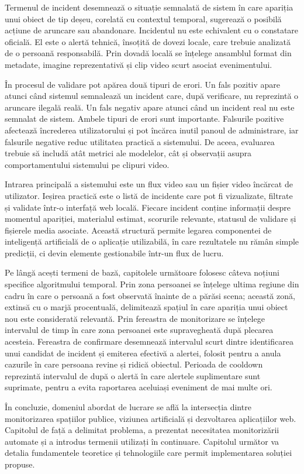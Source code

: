 Termenul de incident desemnează o situație semnalată de sistem în care apariția unui obiect de tip deșeu, corelată cu contextul temporal, sugerează o posibilă acțiune de aruncare sau abandonare. Incidentul nu este echivalent cu o constatare oficială. El este o alertă tehnică, însoțită de dovezi locale, care trebuie analizată de o persoană responsabilă. Prin dovadă locală se înțelege ansamblul format din metadate, imagine reprezentativă și clip video scurt asociat evenimentului.

În procesul de validare pot apărea două tipuri de erori. Un fals pozitiv apare atunci când sistemul semnalează un incident care, după verificare, nu reprezintă o aruncare ilegală reală. Un fals negativ apare atunci când un incident real nu este semnalat de sistem. Ambele tipuri de erori sunt importante. Falsurile pozitive afectează încrederea utilizatorului și pot încărca inutil panoul de administrare, iar falsurile negative reduc utilitatea practică a sistemului. De aceea, evaluarea trebuie să includă atât metrici ale modelelor, cât și observații asupra comportamentului sistemului pe clipuri video.

Intrarea principală a sistemului este un flux video sau un fișier video încărcat de utilizator. Ieșirea practică este o listă de incidente care pot fi vizualizate, filtrate și validate într-o interfață web locală. Fiecare incident conține informații despre momentul apariției, materialul estimat, scorurile relevante, statusul de validare și fișierele media asociate. Această structură permite legarea componentei de inteligență artificială de o aplicație utilizabilă, în care rezultatele nu rămân simple predicții, ci devin elemente gestionabile într-un flux de lucru.

Pe lângă acești termeni de bază, capitolele următoare folosesc câteva noțiuni specifice algoritmului temporal. Prin zona persoanei se înțelege ultima regiune din cadru în care o persoană a fost observată înainte de a părăsi scena; această zonă, extinsă cu o marjă procentuală, delimitează spațiul în care apariția unui obiect nou este considerată relevantă. Prin fereastra de monitorizare se înțelege intervalul de timp în care zona persoanei este supravegheată după plecarea acesteia. Fereastra de confirmare desemnează intervalul scurt dintre identificarea unui candidat de incident și emiterea efectivă a alertei, folosit pentru a anula cazurile în care persoana revine și ridică obiectul. Perioada de cooldown reprezintă intervalul de după o alertă în care alertele suplimentare sunt suprimate, pentru a evita raportarea aceluiași eveniment de mai multe ori.

În concluzie, domeniul abordat de lucrare se află la intersecția dintre monitorizarea spațiilor publice, viziunea artificială și dezvoltarea aplicațiilor web. Capitolul de față a delimitat problema, a prezentat necesitatea monitorizării automate și a introdus termenii utilizați în continuare. Capitolul următor va detalia fundamentele teoretice și tehnologiile care permit implementarea soluției propuse.
